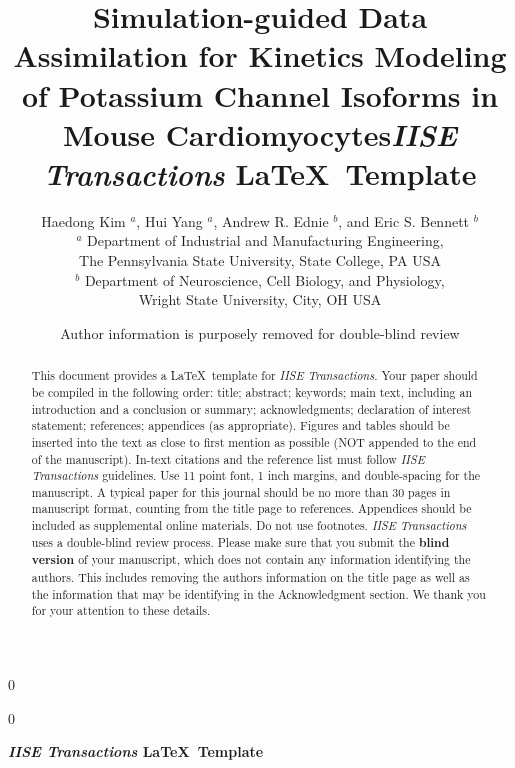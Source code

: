 \documentclass[11pt]{article}
\newcommand{\blind}{0}
\begin{document}
	\def\spacingset#1{\renewcommand{\baselinestretch}%
		{#1}\small\normalsize} \spacingset{1}

	\blind
	{
		\title{\bf Simulation-guided Data Assimilation for Kinetics Modeling of Potassium Channel Isoforms in Mouse Cardiomyocytes}
		\author{Haedong Kim $^a$, Hui Yang $^a$, Andrew R. Ednie $^b$, and Eric S. Bennett $^b$ \\
		$^a$ Department of Industrial and Manufacturing Engineering, \\
		The Pennsylvania State University, State College, PA USA \\
        $^b$ Department of Neuroscience, Cell Biology, and Physiology, \\
        Wright State University, City, OH USA}
		\date{}
		\maketitle
	} \fi

	\blind
	{
        \title{\bf \emph{IISE Transactions} \LaTeX \ Template}
		\author{Author information is purposely removed for double-blind review}

\bigskip
		\bigskip
		\bigskip
		\begin{center}
			{\LARGE\bf \emph{IISE Transactions} \LaTeX \ Template}
		\end{center}
		\medskip
	} \fi
	\bigskip

\begin{abstract}
This document provides a \LaTeX \ template for \emph{IISE Transactions}. Your paper should be compiled in the following order: title; abstract; keywords; main text, including an introduction and a conclusion or summary; acknowledgments; declaration of interest statement; references; appendices (as appropriate). Figures and tables should be inserted into the text as close to first mention as possible (NOT appended to the end of the manuscript). In-text citations and the reference list must follow \emph{IISE Transactions} guidelines. Use 11 point font, 1 inch margins, and double-spacing for the manuscript. A typical paper for this journal should be no more than 30 pages in manuscript format, counting from the title page to references. Appendices should be included as supplemental online materials. Do not use footnotes. \emph{IISE Transactions} uses a double-blind review process. Please make sure that you submit the \textbf{blind version} of your manuscript, which does not contain any information identifying the authors.  This includes removing the authors information on the title page as well as the information that may be identifying in the Acknowledgment section. We thank you for your attention to these details.
\end{abstract}
\end{document}
